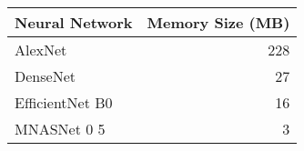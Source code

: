 \begin{tabular}{lr}
\toprule
Neural Network & Memory Size (MB) \\
\midrule
AlexNet & 228 \\
DenseNet & 27 \\
EfficientNet B0 & 16 \\
MNASNet 0 5 & 3 \\
\bottomrule
\end{tabular}
